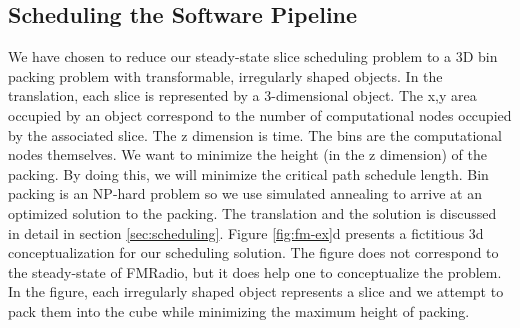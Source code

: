 \subsection{Scheduling the Software Pipeline}
We have chosen to reduce our steady-state slice scheduling problem to
a 3D bin packing problem \cite{binpacking} with transformable,
irregularly shaped objects.  In the translation, each slice is
represented by a 3-dimensional object.  The x,y area occupied by an
object correspond to the number of computational nodes occupied by the
associated slice. The z dimension is time.  The bins are the
computational nodes themselves.  We want to minimize the height (in
the z dimension) of the packing.  By doing this, we will minimize the
critical path schedule length.  Bin packing is an NP-hard problem so
we use simulated annealing to arrive at an optimized solution to the
packing.  The translation and the solution is discussed in detail in
section \ref{sec:scheduling}. Figure \ref{fig:fm-ex}d presents a
fictitious 3d conceptualization for our scheduling solution.  The
figure does not correspond to the steady-state of FMRadio, but it does
help one to conceptualize the problem. In the figure, each irregularly
shaped object represents a slice and we attempt to pack them into the
cube while minimizing the maximum height of packing.

